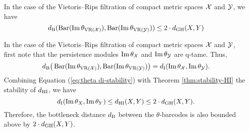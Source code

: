 \subsubsection{}
\corollary
In the case of the Vietoris--Rips filtration of compact metric spaces $\cX$ and $\cY$, we have
\[
\db(\thetabarc{\cX}, \thetabarc{\cY}) \leq 2 \cdot \dgh(X,Y)
\]


In the case of the Vietoris--Rips filtration of compact metric spaces $\cX$ and $\cY$, first note that the persistence modules $\thetamodule{\cX}$ and $\thetamodule{\cY}$ are q-tame.
Thus,
\[
\db\big(\thetabarc{\cX}, \thetabarc{\cY}\big) =
\di(\thetamodule{\cX}, \thetamodule{\cY}).
\]
Combining Equation (\ref{eq:theta di-stability}) with Theorem \ref{thm:stability-HI} the stability of $\dhi$, we have
\[
\di(\thetamodule{X}, \thetamodule{Y}) \leq
\dhi(X,Y)\leq 2\cdot \dgh(X,Y).
\]
Therefore, the bottleneck distance $\db$ between the $\theta$-barcodes is also bounded above by $2\cdot \dgh(X,Y)$.